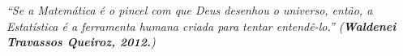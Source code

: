 
\begin{epigrafe}
\vspace{5cm}


\begin{minipage}{10cm}

\textit{``Se a Matemática é o pincel com que Deus desenhou o universo, então, a Estatística é a ferramenta humana criada para tentar entendê-lo.'' (\textbf{Waldenei Travassos Queiroz, 2012.})}

\end{minipage}



\end{epigrafe}




